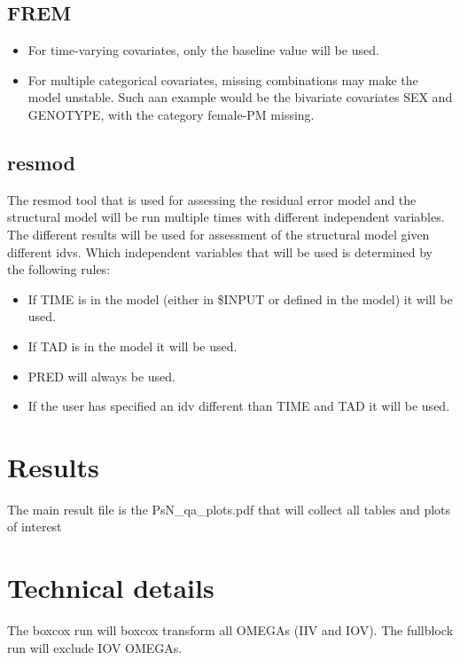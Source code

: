 \subsection{FREM}
\begin{itemize}
	\item For time-varying covariates, only the baseline value will be used.
	\item For multiple categorical covariates, missing combinations may make the model unstable. Such aan example would be the bivariate covariates SEX and GENOTYPE, with the category female-PM missing.
\end{itemize}

\subsection{resmod}
The resmod tool that is used for assessing the residual error model and the structural model will be run multiple times with different independent variables. The different results will be used for assessment of the structural model given different idvs. Which independent variables that will be used is determined by the following rules:
\begin{itemize}
    \item If TIME is in the model (either in \$INPUT or defined in the model) it will be used.
    \item If TAD is in the model it will be used.
    \item PRED will always be used.
    \item If the user has specified an idv different than TIME and TAD it will be used.
\end{itemize}


\section{Results}
The main result file is the PsN\_qa\_plots.pdf that will collect all tables and plots of interest

\section{Technical details}
The boxcox run will boxcox transform all OMEGAs (IIV and IOV). The fullblock run will exclude IOV OMEGAs.




